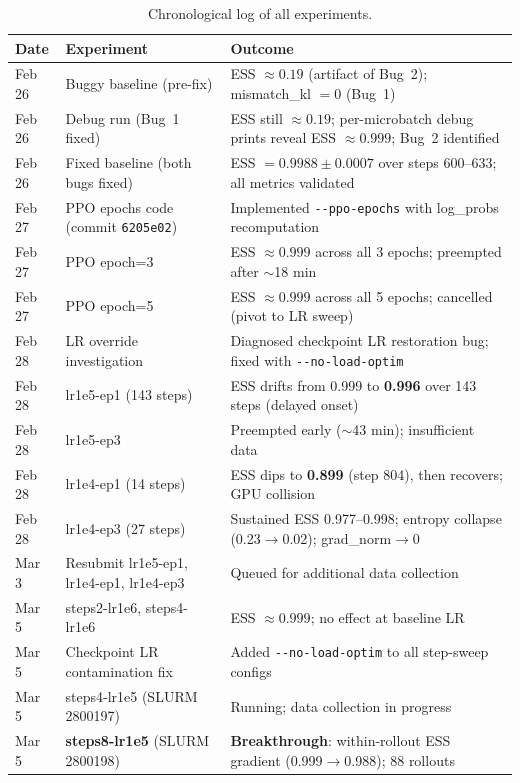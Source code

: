 \documentclass[11pt,a4paper]{article}
\begin{document}
\begin{table}[H]
\centering
\caption{Chronological log of all experiments.}
\label{tab:timeline}
\begin{tabular}{@{}llp{7cm}@{}}
\toprule
\textbf{Date} & \textbf{Experiment} & \textbf{Outcome} \\
\midrule
Feb 26 & Buggy baseline (pre-fix) & ESS $\approx 0.19$ (artifact of Bug~2); mismatch\_kl $= 0$ (Bug~1) \\
Feb 26 & Debug run (Bug~1 fixed) & ESS still $\approx 0.19$; per-microbatch debug prints reveal ESS $\approx 0.999$; Bug~2 identified \\
Feb 26 & Fixed baseline (both bugs fixed) & ESS $= 0.9988 \pm 0.0007$ over steps 600--633; all metrics validated \\
\midrule
Feb 27 & PPO epochs code (commit \texttt{6205e02}) & Implemented \texttt{-{}-ppo-epochs} with log\_probs recomputation \\
Feb 27 & PPO epoch=3 & ESS $\approx 0.999$ across all 3 epochs; preempted after $\sim$18 min \\
Feb 27 & PPO epoch=5 & ESS $\approx 0.999$ across all 5 epochs; cancelled (pivot to LR sweep) \\
\midrule
Feb 28 & LR override investigation & Diagnosed checkpoint LR restoration bug; fixed with \texttt{-{}-no-load-optim} \\
Feb 28 & lr1e5-ep1 (143 steps) & ESS drifts from 0.999 to \textbf{0.996} over 143 steps (delayed onset) \\
Feb 28 & lr1e5-ep3 & Preempted early ($\sim$43 min); insufficient data \\
Feb 28 & lr1e4-ep1 (14 steps) & ESS dips to \textbf{0.899} (step 804), then recovers; GPU collision \\
Feb 28 & lr1e4-ep3 (27 steps) & Sustained ESS 0.977--0.998; entropy collapse (0.23$\to$0.02); grad\_norm$\to$0 \\
\midrule
Mar 3 & Resubmit lr1e5-ep1, lr1e4-ep1, lr1e4-ep3 & Queued for additional data collection \\
\midrule
Mar 5 & steps2-lr1e6, steps4-lr1e6 & ESS $\approx 0.999$; no effect at baseline LR \\
Mar 5 & Checkpoint LR contamination fix & Added \texttt{-{}-no-load-optim} to all step-sweep configs \\
Mar 5 & steps4-lr1e5 (SLURM 2800197) & Running; data collection in progress \\
Mar 5 & \textbf{steps8-lr1e5} (SLURM 2800198) & \textbf{Breakthrough}: within-rollout ESS gradient (0.999$\to$0.988); 88 rollouts \\

\end{tabular}
\end{table}
\end{document}
